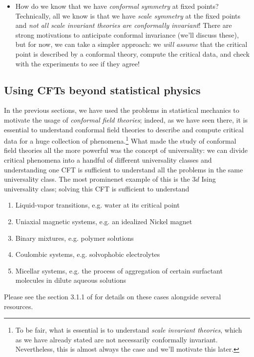 \documentclass[12pt]{article}
\numberwithin{equation}{section}
\begin{document}
\begin{itemize}
\item How do we know that we have \emph{conformal symmetry} at fixed points? Technically, all we know is that we have \emph{scale symmetry} at the fixed points and \emph{not all scale invariant theories are conformally invariant}! There are strong motivations to anticipate conformal invariance (we'll discuss these), but for now, we can take a simpler approach: we \emph{will assume} that the critical point is described by a conformal theory, compute the critical data, and check with the experiments to see if they agree!

\end{itemize}

\subsection{Using CFTs beyond statistical physics}

In the previous sections, we have used the problems in statistical mechanics to motivate the usage of \emph{conformal field theories}; indeed, as we have seen there, it is essential to understand conformal field theories to describe and compute critical data for a huge collection of phenomena.\footnote{To be fair, what is essential is to understand \emph{scale invariant theories}, which as we have already stated are not necessarily conformally invariant. Nevertheless, this is almost always the case and we'll motivate this later.} What made the study of conformal field theories all the more powerful was the concept of universality: we can divide critical phenomena into a handful of different universality classes and understanding one CFT is sufficient to understand all the problems in the same universality class. The most prominenet example of this is the $3d$ Ising universality class; solving this CFT is sufficient to understand
\begin{enumerate}
	\item Liquid-vapor transitions, e.g. water at its critical point
	\item Uniaxial magnetic systems, e.g. an idealized Nickel magnet
	\item Binary mixtures, e.g. polymer solutions 
	\item Coulombic systems, e.g. solvophobic electrolytes
	\item Micellar systems, e.g. the process of aggregation of certain surfactant molecules in dilute aqueous solutions
\end{enumerate}
Please see the section 3.1.1 of \cite{Pelissetto:2000ek} for details on these cases alongside several resources. 
\end{document}
